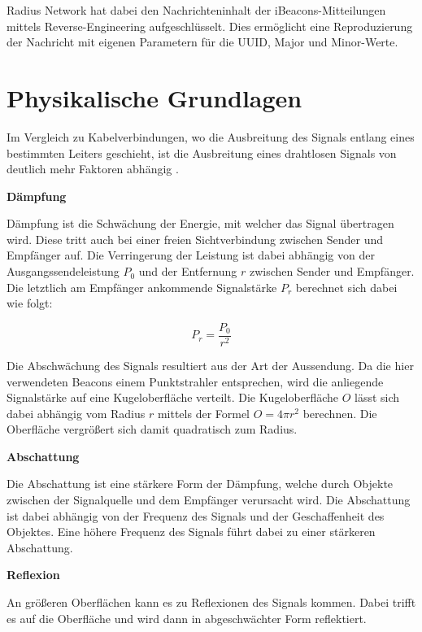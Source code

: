 Radius Network hat dabei den Nachrichteninhalt der iBeacons-Mitteilungen mittels Reverse-Engineering aufgeschlüsselt. Dies ermöglicht eine Reproduzierung der Nachricht mit eigenen Parametern für die UUID, Major und Minor-Werte.

\section{Physikalische Grundlagen}
\label{sec:dataandmeasurement:physics}
Im Vergleich zu Kabelverbindungen, wo die Ausbreitung des Signals entlang eines bestimmten Leiters geschieht, ist die Ausbreitung eines drahtlosen Signals von deutlich mehr Faktoren abhängig \cite{signalverbreitung}. 

\textbf{Dämpfung}

Dämpfung ist die Schwächung der Energie, mit welcher das Signal übertragen wird. Diese tritt auch bei einer freien Sichtverbindung zwischen Sender und Empfänger auf. Die Verringerung der Leistung ist dabei abhängig von der Ausgangssendeleistung $P_0$ und der Entfernung $r$ zwischen Sender und Empfänger. Die letztlich am Empfänger ankommende Signalstärke $P_r$ berechnet sich dabei wie folgt:

\begin{equation}
	P_r = \frac{P_0}{r^{2}} 
\end{equation}

Die Abschwächung des Signals resultiert aus der Art der Aussendung. Da die hier verwendeten Beacons einem Punktstrahler entsprechen, wird die anliegende Signalstärke auf eine Kugeloberfläche verteilt. Die Kugeloberfläche $O$ lässt sich dabei abhängig vom Radius $r$ mittels der Formel $O = 4 \pi r^{2}$ berechnen. Die Oberfläche vergrößert sich damit quadratisch zum Radius.

\textbf{Abschattung}

Die Abschattung ist eine stärkere Form der Dämpfung, welche durch Objekte zwischen der Signalquelle und dem Empfänger verursacht wird. Die Abschattung ist dabei abhängig von der Frequenz des Signals und der Geschaffenheit des Objektes. Eine höhere Frequenz des Signals führt dabei zu einer stärkeren Abschattung.

\textbf{Reflexion}

An größeren Oberflächen kann es zu Reflexionen des Signals kommen. Dabei trifft es auf die Oberfläche und wird dann in abgeschwächter Form reflektiert.

